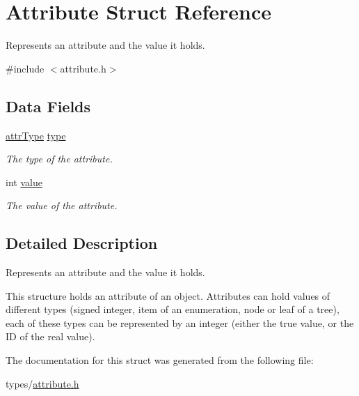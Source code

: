 \hypertarget{struct_attribute}{}\section{Attribute Struct Reference}
\label{struct_attribute}


Represents an attribute and the value it holds.  




{\ttfamily \#include $<$attribute.\+h$>$}

\subsection*{Data Fields}
\begin{DoxyCompactItemize}
\item 
\hyperlink{attribute-types_8h_a1d7db01768b8c6ad96eb92c7f6a30f1b}{attr\+Type} \hyperlink{struct_attribute_a88721cff203fdfc8fcd285540041557f}{type}\hypertarget{struct_attribute_a88721cff203fdfc8fcd285540041557f}{}\label{struct_attribute_a88721cff203fdfc8fcd285540041557f}

\begin{DoxyCompactList}\small\item\em The type of the attribute. \end{DoxyCompactList}\item 
int \hyperlink{struct_attribute_ac4f474c82e82cbb89ca7c36dd52be0ed}{value}\hypertarget{struct_attribute_ac4f474c82e82cbb89ca7c36dd52be0ed}{}\label{struct_attribute_ac4f474c82e82cbb89ca7c36dd52be0ed}

\begin{DoxyCompactList}\small\item\em The value of the attribute. \end{DoxyCompactList}\end{DoxyCompactItemize}


\subsection{Detailed Description}
Represents an attribute and the value it holds. 

This structure holds an attribute of an object. Attributes can hold values of different types (signed integer, item of an enumeration, node or leaf of a tree), each of these types can be represented by an integer (either the true value, or the ID of the real value). 

The documentation for this struct was generated from the following file\+:\begin{DoxyCompactItemize}
\item 
types/\hyperlink{attribute_8h}{attribute.\+h}\end{DoxyCompactItemize}
